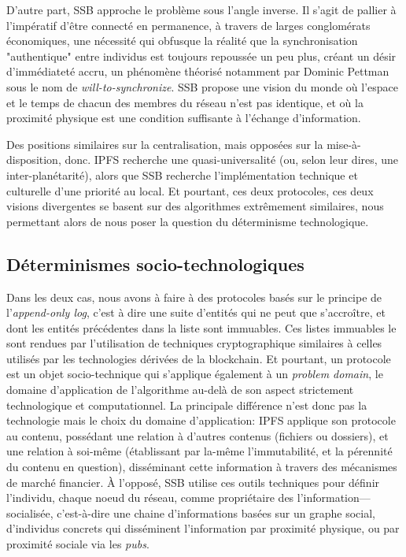 \documentclass{article}
\begin{document}
D'autre part, SSB approche le problème sous l'angle inverse. Il s'agit de pallier à l'impératif d'être connecté en permanence, à travers de larges conglomérats économiques, une nécessité qui obfusque la réalité que la synchronisation "authentique" entre individus est toujours repoussée un peu plus, créant un désir d'immédiateté accru, un phénomène théorisé notamment par Dominic Pettman\cite{pettman_infinite_2015} sous le nom de \emph{will-to-synchronize}. SSB propose une vision du monde où l'espace et le temps de chacun des membres du réseau n'est pas identique, et où la proximité physique est une condition suffisante à l'échange d'information.

Des positions similaires sur la centralisation, mais opposées sur la mise-à-disposition, donc. IPFS recherche une quasi-universalité (ou, selon leur dires, une inter-planétarité), alors que SSB recherche l'implémentation technique et culturelle d'une priorité au local. Et pourtant, ces deux protocoles, ces deux visions divergentes se basent sur des algorithmes extrêmement similaires, nous permettant alors de nous poser la question du déterminisme technologique.

\subsection{Déterminismes socio-technologiques}

Dans les deux cas, nous avons à faire à des protocoles basés sur le principe de l'\emph{append-only log}, c'est à dire une suite d'entités qui ne peut que s'accroître, et dont les entités précédentes dans la liste sont immuables. Ces listes immuables le sont rendues par l'utilisation de techniques cryptographique similaires à celles utilisés par les technologies dérivées de la blockchain. Et pourtant, un protocole est un objet socio-technique qui s'applique également à un \emph{problem domain}, le domaine d'application de l'algorithme au-delà de son aspect strictement technologique et computationnel. La principale différence n'est donc pas la technologie mais le choix du domaine d'application: IPFS applique son protocole au contenu, possédant une relation à d'autres contenus (fichiers ou dossiers), et une relation à soi-même (établissant par la-même l'immutabilité, et la pérennité du contenu en question), disséminant cette information à travers des mécanismes de marché financier. À l'opposé, SSB utilise ces outils techniques pour définir l'individu, chaque noeud du réseau, comme propriétaire des l'information—socialisée, c'est-à-dire une chaine d'informations basées sur un graphe social, d'individus concrets qui disséminent l'information par proximité physique, ou par proximité sociale via les \emph{pubs}.
\end{document}
